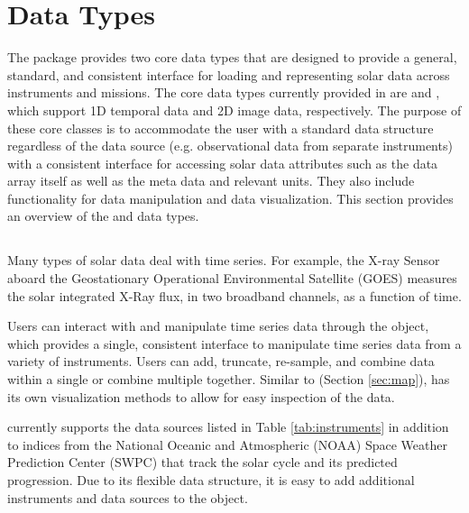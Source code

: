  \section{Data Types}
\label{sec:data_types}

The \sunpypkg package provides two core data types that are designed to provide a general, standard, and consistent interface for loading and representing solar data across instruments and missions.
The core data types currently provided in \sunpypkg are \Timeseries and \Map, which support 1D temporal data and 2D image data, respectively. 
The purpose of these core classes is to accommodate the user with a standard data structure regardless of the data source (e.g. observational data from separate instruments) with a consistent interface for accessing solar data attributes such as the data array itself as well as the meta data and relevant units.
They also include functionality for data manipulation and data visualization. 
This section provides an overview of the \Timeseries and \Map data types.

\subsection{\Timeseries}
\label{sec:timeseries}
Many types of solar data deal with time series. 
For example, the X-ray Sensor aboard the Geostationary Operational Environmental Satellite (GOES) measures the solar integrated X-Ray flux, in two broadband channels, as a function of time. 

Users can interact with and manipulate time series data through the \Timeseries object, which provides a single, consistent interface to manipulate time series data from a variety of instruments. 
Users can add, truncate, re-sample, and combine data within a single \Timeseries or combine multiple \Timeseries together. 
Similar to \Map (Section \ref{sec:map}), \Timeseries has its own visualization methods to allow for easy inspection of the data.

\Timeseries currently supports the data sources listed in Table \ref{tab:instruments} in addition to indices from the National Oceanic and Atmospheric (NOAA) Space Weather Prediction Center (SWPC) that track the solar cycle and its predicted progression. Due to its flexible data structure, it is easy to add additional instruments and data sources to the \Timeseries object.

